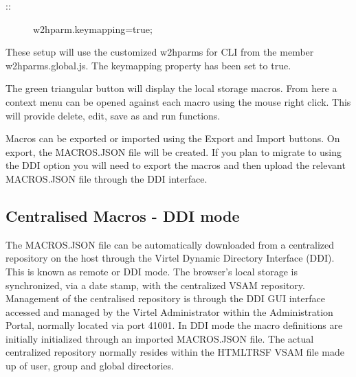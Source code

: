 \documentclass[letterpaper,10pt,english]{sphinxmanual}
\begin{document}
\begin{description}
\item[{::}] \leavevmode
w2hparm.keymapping=true;

\end{description}


These setup will use the customized w2hparms for CLI from the member w2hparms.global.js. The keymapping property has been set to true.

\ignorespaces 
{}

The green triangular button will display the local storage macros. From here a context menu can be opened against each macro using the mouse right click. This will provide delete, edit, save as and run functions.



\ignorespaces 
{}

Macros can be exported or imported using the Export and Import buttons. On export, the MACROS.JSON file will be created. If you plan to migrate to using the DDI option you will need to export the macros and then upload the relevant MACROS.JSON file through the DDI interface.

\ignorespaces 

\subsection{Centralised Macros - DDI mode}
\label{\detokenize{Customization:centralised-macros-ddi-mode}}\label{\detokenize{Customization:index-84}}
The MACROS.JSON file can be automatically downloaded from a centralized repository on the host through the Virtel Dynamic Directory Interface (DDI). This is known as remote or DDI mode. The browser’s local storage is synchronized, via a date stamp, with the centralized VSAM repository. Management of the centralised repository is through the DDI GUI interface accessed and managed by the Virtel Administrator within the Administration Portal, normally located via port 41001. In DDI mode the macro definitions are initially initialized through an imported MACROS.JSON file. The actual centralized repository normally resides within the HTMLTRSF VSAM file made up of user, group and global directories.
\end{document}
